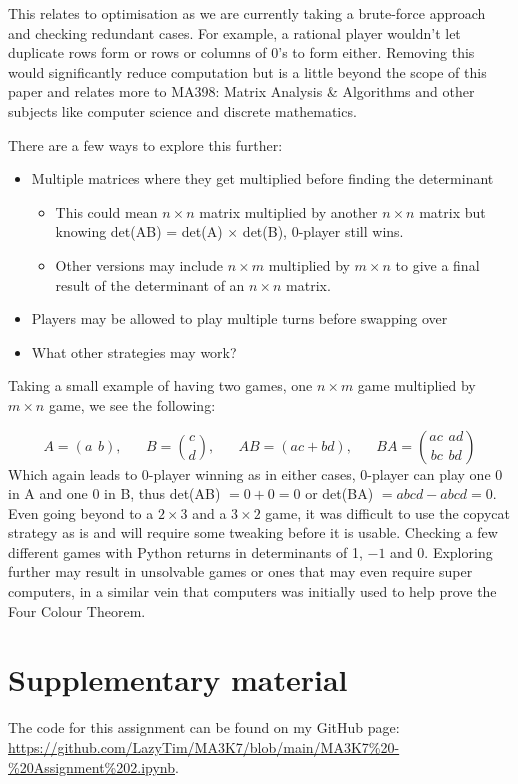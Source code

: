 \documentclass[11pt]{article}
\newcommand{\keywordfont}{\textsc}
\newcommand{\keyword}[1]{%
  \marginpar{\raggedright\small\keywordfont{#1}}}
\begin{document}
This relates to optimisation as we are currently taking a brute-force approach and checking redundant cases. For example, a rational player wouldn't let duplicate rows form or rows or columns of 0's to form either. Removing this would significantly reduce computation but is a little beyond the scope of this paper and relates more to MA398: Matrix Analysis \& Algorithms and other subjects like computer science and discrete mathematics.
 
There are a few ways to \keyword{Extend} explore this further:
\begin{itemize}
    \item Multiple matrices where they get multiplied before finding the determinant
    \begin{itemize}
        \item This could mean $n \times n$ matrix multiplied by another $n \times n$ matrix but knowing det(AB) = det(A) $ \times $ det(B), 0-player still wins.
        \item Other versions may include $n \times m$ multiplied by $m \times n$ to give a final result of the determinant of an $n \times n$ matrix.
    \end{itemize}
    \item Players may be allowed to play multiple turns before swapping over
    \item What other strategies may work?
\end{itemize}

Taking a small example of having two \keyword{Specialise} games, one $n \times m$ game multiplied by $m \times n$ game, we see the following:

\[
A = (a \hspace{5pt} b), \hspace{20pt} B = \binom{c}{d}, \hspace{20pt} AB = (ac + bd), \hspace{20pt} BA = \binom{ac \hspace{5pt} ad}{bc \hspace{5pt} bd}
\]
Which again leads to 0-player winning as in either cases, 0-player can play one 0 in A and one 0 in B, thus det(AB) $= 0 + 0 = 0$ or det(BA) $= abcd - abcd = 0$. Even going beyond to a $2 \times 3$ and a $3 \times 2$ game, it was difficult to use the copycat strategy as is and will require some tweaking before it is usable. Checking \keyword{Check} a few different games with Python returns in determinants of 1, $-1$ and 0. Exploring further may result in unsolvable games or ones that may even require super computers, in a similar vein that computers was initially used to help prove the Four Colour Theorem.


\section*{Supplementary material}
The code for this assignment can be found on my GitHub page:  \url{https://github.com/LazyTim/MA3K7/blob/main/MA3K7%20-%20Assignment%202.ipynb}.
\end{document}
